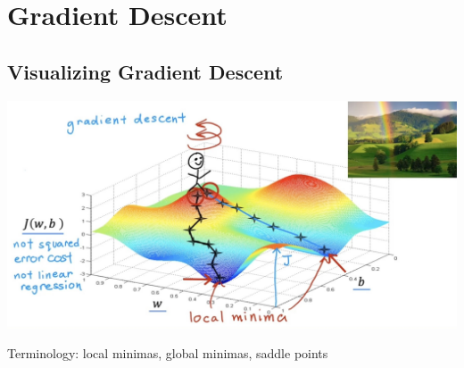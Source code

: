 \chapter{Gradient Descent}
\section{Visualizing Gradient Descent}
\noindent
\includegraphics[width=\textwidth]{images/2.2_4}
\begin{notebox}
    Terminology: 
    local minimas, global minimas, saddle points
\end{notebox}

